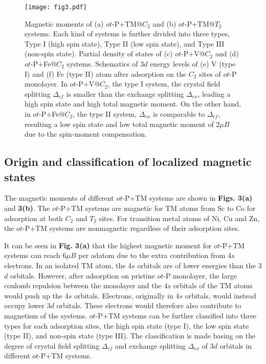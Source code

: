 \documentclass[%
superscriptaddress,
preprint,
showpacs,preprintnumbers,
 amsmath,amssymb,
prb,
]{revtex4-1}
\begin{document}
\begin{figure}[ptb]
\centering
\texttt{[image: fig3.pdf]}
\caption{{\footnotesize{}Magnetic moments of (a) $ot$-P+TM@$C_{2}$ and (b) $ot$-P+TM@$T_{2}$ systems. Each kind of systems is further divided into three types, Type I (high spin state), Type II (low spin state), and Type III (non-spin state). Partial density of states of (c) $ot$-P+V@$C_{2}$ and (d) $ot$-P+Fe@$C_{2}$ systems. Schematics of 3$d$ energy levels of (e) V (type I) and (f) Fe (type II) atom after adsorption on the $C_{2}$ sites of $ot$-P monolayer. In $ot$-P+V@$C_{2}$, the type I system, the crystal field splitting $\Delta_{cf}$ is smaller than the exchange splitting $\Delta_{ex}$, leading a high spin state and high total magnetic moment. On the other hand, in $ot$-P+Fe@$C_{2}$, the type II system, $\Delta_{ex}$ is comparable to $\Delta_{cf}$, resulting a low spin state and low total magnetic moment of $2\mu B$ due to the spin-moment compensation. \label{fig:MagMom+PDOS+ELevel}}}
\end{figure}



\subsection{Origin and classification of localized magnetic states}

The magnetic moments of different $ot$-P+TM systems are shown in \textbf{Figs. 3(a)} and \textbf{3(b)}. The $ot$-P+TM systems are magnetic for TM atoms from Sc to Co for adsorption at both $C_{2}$ and $T_{2}$ sites. For transition metal atoms of Ni, Cu and Zn, the $ot$-P+TM systems are nonmagnetic regardless of their adsorption sites.

It can be seen in \textbf{Fig. 3(a)} that the highest magnetic moment
for $ot$-P+TM systems can reach $6\mu B$ per adatom due to the extra contribution
from 4$s$ electrons. In an isolated TM atom, the
4$s$ orbitals are of lower energies than the 3$d$ orbitals. However, after
adsorption on pristine $ot$-P monolayer, the large coulomb repulsion
between the monolayer and the 4$s$ orbitals of the TM atoms would push
up the 4$s$ orbitals. Electrons, originally in 4$s$ orbitals, would
instead occupy lower 3$d$ orbitals. These electrons would therefore also
contribute to magnetism of the systems. $ot$-P+TM systems can be further
classified into three types for each adsorption sites, the high spin
state (type I), the low spin state (type II), and non-spin state (type III). The classification
is made basing on the degree of crystal field splitting $\Delta_{cf}$
and exchange splitting $\Delta_{ex}$ of 3$d$ orbitals in different $ot$-P+TM systems.
\end{document}
